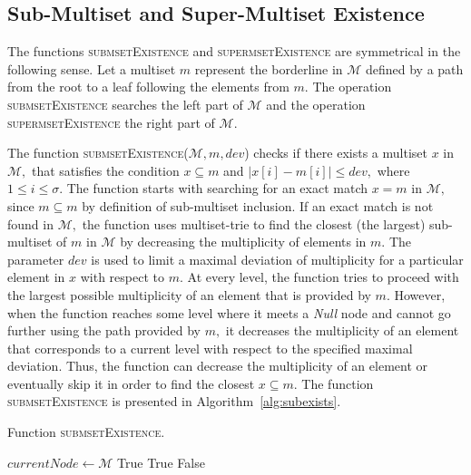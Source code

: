 \documentclass[algorithms,article,accept,pdftex,moreauthors]{Definitions/mdpi}
\begin{document}
\subsection{Sub-Multiset and Super-Multiset Existence}
\label{s:subexists} \label{s:superexists}
The functions \textsc{submsetExistence} and \textsc{supermsetExistence} are
symmetrical in the following sense. Let a multiset $m$ represent the borderline
in $\mathcal{M}$ defined by a path from the root to a leaf following
the elements from $m$. The operation \textsc{submsetExistence} searches
the left part of $\mathcal{M}$ and the operation \textsc{supermsetExistence}
the right part of $\mathcal{M}$. 

The function \textsc{submsetExistence}($\mathcal{M},m,dev$) checks if there exists 
a multiset $x$ in $\mathcal{M},$ that satisfies the condition $x\subseteq m$ and 
$| x[i] - m[i] | \leq dev,$ where $1\leq i \leq \sigma.$ 
The function starts with searching for an exact match $x=m$ in $\mathcal{M},$ 
since $m\subseteq m$ by definition of sub-multiset inclusion. If an exact match is 
not found in $\mathcal{M},$ the function uses multiset-trie to find the closest 
(the largest) sub-multiset of $m$ in $\mathcal{M}$ by decreasing the multiplicity of 
elements in $m.$ The parameter $dev$ is used to limit a maximal deviation of 
multiplicity for a particular element in $x$ with respect to $m.$ 
At every level, the function tries to proceed with the largest possible multiplicity of 
an element that is provided by $m.$ However, when the function reaches some level 
where it meets a \emph{Null} node and cannot go further using the path provided by 
$m,$ it decreases the multiplicity of an element 
that corresponds to a current level with respect to the specified maximal deviation. 
Thus, the function can decrease the multiplicity of an element or eventually skip it in 
order to find the closest $x\subseteq m.$ The function \textsc{submsetExistence} 
is presented in Algorithm~\ref{alg:subexists}.

\begin{algorithm}[H]
\caption{Function \textsc{submsetExistence}.}
\label{alg:subexists}
\begin{algorithmic}[1]
\State $currentNode \gets \mathcal{M}$
\State \Return True
\EndIf
{}
\State \Return True
\EndIf
\EndIf
\EndFor
\State \Return False
\EndFunction
\end{algorithmic}
\end{algorithm}
\end{document}
